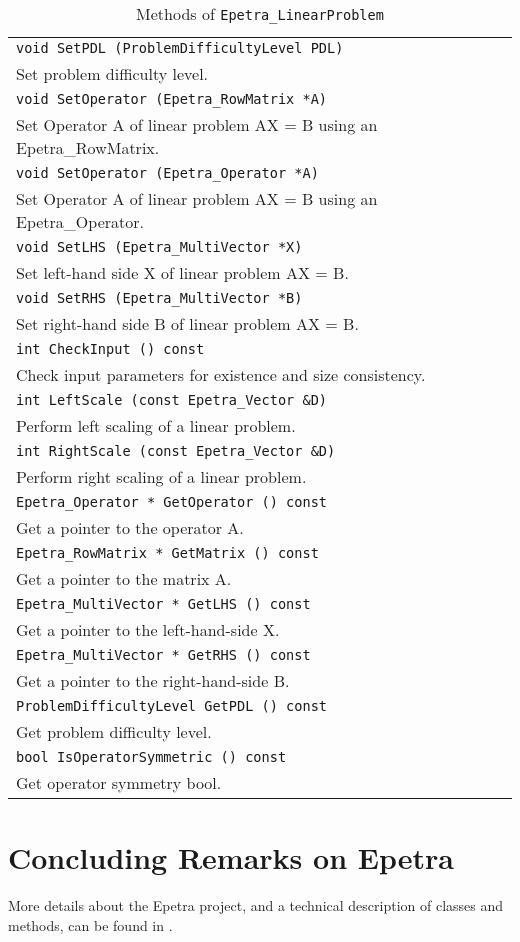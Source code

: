 \begin{table}
\begin{center}
\begin{tabular}{ | p{15cm} | }
\hline
\tt void 
SetPDL (ProblemDifficultyLevel PDL) \\
Set problem difficulty level.  \\
\tt void 
SetOperator (Epetra\_RowMatrix *A) \\
Set Operator A of linear problem AX = B using an Epetra\_RowMatrix.  \\
\tt void 
SetOperator (Epetra\_Operator *A) \\
Set Operator A of linear problem AX = B using an Epetra\_Operator.  \\
\tt void 
SetLHS (Epetra\_MultiVector *X) \\
Set left-hand side X of linear problem AX = B. \\
\tt void 
SetRHS (Epetra\_MultiVector *B) \\
Set right-hand side B of linear problem AX = B.  \\
\tt int 
CheckInput () const \\
Check input parameters for existence and size consistency. \\
\tt int  
LeftScale (const Epetra\_Vector \&D) \\
Perform left scaling of a linear problem.  \\
\tt int 
RightScale (const Epetra\_Vector \&D) \\
Perform right scaling of a linear problem. \\
\tt Epetra\_Operator * 
GetOperator () const\\
Get a pointer to the operator A. \\
\tt Epetra\_RowMatrix * 
GetMatrix () const \\
Get a pointer to the matrix A. \\
\tt Epetra\_MultiVector * 
GetLHS () const \\
Get a pointer to the left-hand-side X. \\
\tt Epetra\_MultiVector * 
GetRHS () const \\
Get a pointer to the right-hand-side B. \\
\tt ProblemDifficultyLevel 
GetPDL () const \\
Get problem difficulty level. \\
\tt bool 
IsOperatorSymmetric () const \\
Get operator symmetry bool. \\
\hline
\end{tabular}
\caption{Methods of {\tt Epetra\_LinearProblem}}
\label{tab:linear_sys}
\end{center}
\end{table}






\section{Concluding Remarks on Epetra}
\label{sec:epetra_concluding}

More details about the Epetra project, and a technical description of
classes and methods, can be found in
\cite{Epetra-Ref-Guide-new,Epetra-Users-Guide}.

